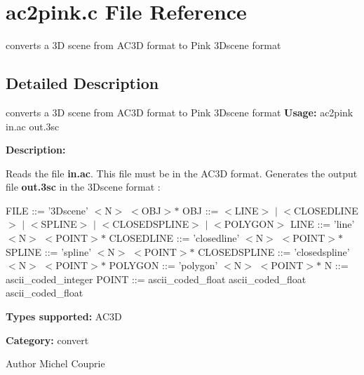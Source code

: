 \section{ac2pink.c File Reference}
\label{ac2pink_8c}


converts a 3D scene from AC3D format to Pink 3Dscene format  




\subsection{Detailed Description}
converts a 3D scene from AC3D format to Pink 3Dscene format {\bfseries Usage:} ac2pink in.ac out.3sc

{\bfseries Description:}

Reads the file {\bfseries in.ac}. This file must be in the AC3D format. Generates the output file {\bfseries out.3sc} in the 3Dscene format :

FILE ::= '3Dscene' $<$N$>$ $<$OBJ$>$$\ast$ OBJ ::= $<$LINE$>$ $|$ $<$CLOSEDLINE$>$ $|$ $<$SPLINE$>$ $|$ $<$CLOSEDSPLINE$>$ $|$ $<$POLYGON$>$ LINE ::= 'line' $<$N$>$ $<$POINT$>$$\ast$ CLOSEDLINE ::= 'closedline' $<$N$>$ $<$POINT$>$$\ast$ SPLINE ::= 'spline' $<$N$>$ $<$POINT$>$$\ast$ CLOSEDSPLINE ::= 'closedspline' $<$N$>$ $<$POINT$>$$\ast$ POLYGON ::= 'polygon' $<$N$>$ $<$POINT$>$$\ast$ N ::= ascii\_\-coded\_\-integer POINT ::= ascii\_\-coded\_\-float ascii\_\-coded\_\-float ascii\_\-coded\_\-float

{\bfseries Types supported:} AC3D

{\bfseries Category:} convert

\begin{DoxyAuthor}{Author}
Michel Couprie 
\end{DoxyAuthor}
